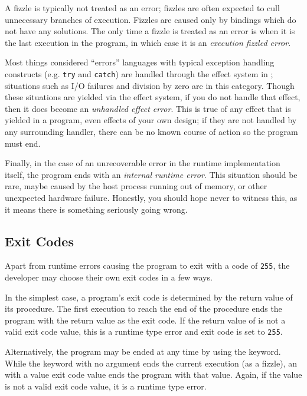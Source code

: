 A fizzle is typically not treated as an error; fizzles are often expected
to cull unnecessary branches of execution. Fizzles are caused only by bindings
which do not have any solutions. The only time a fizzle is treated as an error
is when it is the last execution in the program, in which case it is an \emph{execution
fizzled error}.

Most things considered ``errors'' languages with typical exception
handling constructs (e.g. \texttt{try} and \texttt{catch}) are handled through
the effect system in \Trilogy{}; situations such as I/O failures and division by
zero are in this category. Though these situations are yielded via the effect
system, if you do not handle that effect, then it does become an
\emph{unhandled effect error}. This is true of any effect that is yielded in
a program, even effects of your own design; if they are not handled by any
surrounding handler, there can be no known course of action so the program
must end.

Finally, in the case of an unrecoverable error in the runtime implementation
itself, the program ends with an \emph{internal runtime error}. This situation
should be rare, maybe caused by the host process running out of memory, or
other unexpected hardware failure. Honestly, you should hope never to witness
this, as it means there is something seriously going wrong.

\subsection{Exit Codes}
\label{sec:exitcode}

Apart from runtime errors causing the program to exit with a code of \texttt{255},
the developer may choose their own exit codes in a few ways.

In the simplest case, a \Trilogy{} program's exit code is determined by the
return value of its  procedure. The first execution to reach the end
of the  procedure ends the program with the return value as the exit
code. If the return value of  is not a valid exit code value, this
is a runtime type error and exit code is set to \texttt{255}.

Alternatively, the program may be ended at any time by using the  keyword.
While the  keyword with no argument ends the current execution (as a fizzle),
an  with a value exit code value ends the program with that value. Again, if
the value is not a valid exit code value, it is a runtime type error.
